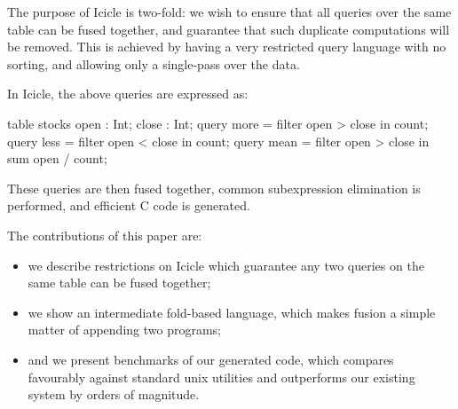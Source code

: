 The purpose of Icicle is two-fold: we wish to ensure that all queries over the same table can be fused together, and guarantee that such duplicate computations will be removed.
This is achieved by having a very restricted query language with no sorting, and allowing only a single-pass over the data.

In Icicle, the above queries are expressed as:
\begin{code}
table stocks { open : Int; close : Int; }
query more = filter open > close in count;
query less = filter open < close in count;
query mean = filter open > close in sum open / count;
\end{code}

These queries are then fused together, common subexpression elimination is performed, and efficient C code is generated.

The contributions of this paper are:
\begin{itemize}
\item
we describe restrictions on Icicle which guarantee any two queries on the same table can be fused together;
\item
we show an intermediate fold-based language, which makes fusion a simple matter of appending two programs;
\item
and we present benchmarks of our generated code, which compares favourably against standard unix utilities and outperforms our existing system by orders of magnitude.
\end{itemize}
